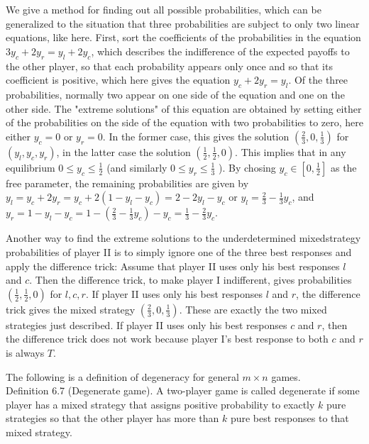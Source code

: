 \documentclass[12pt]{article}
\begin{document}
We give a method for finding out all possible probabilities, which can be generalized to the situation that three probabilities are subject to only two linear equations, like here. First, sort the coefficients of the probabilities in the equation $3 y_{c}+2 y_{r}=y_{l}+2 y_{c}$, which describes the indifference of the expected payoffs to the other player, so that each probability appears only once and so that its coefficient is positive, which here gives the equation $y_{c}+2 y_{r}=y_{l}$. Of the three\\
probabilities, normally two appear on one side of the equation and one on the other side. The "extreme solutions" of this equation are obtained by setting either of the probabilities on the side of the equation with two probabilities to zero, here either $y_{c}=0$ or $y_{r}=0$. In the former case, this gives the solution $\left(\frac{2}{3}, 0, \frac{1}{3}\right)$ for $\left(y_{l}, y_{c}, y_{r}\right)$, in the latter case the solution $\left(\frac{1}{2}, \frac{1}{2}, 0\right)$. This implies that in any equilibrium $0 \leq y_{c} \leq \frac{1}{2}$ (and similarly $0 \leq y_{r} \leq \frac{1}{3}$ ). By chosing $y_{c} \in\left[0, \frac{1}{2}\right]$ as the free parameter, the remaining probabilities are given by $y_{l}=y_{c}+2 y_{r}=y_{c}+2\left(1-y_{l}-y_{c}\right)=2-2 y_{l}-y_{c}$ or $y_{l}=\frac{2}{3}-\frac{1}{3} y_{c}$, and $y_{r}=1-y_{l}-y_{c}=1-\left(\frac{2}{3}-\frac{1}{3} y_{c}\right)-y_{c}=\frac{1}{3}-\frac{2}{3} y_{c}$.

Another way to find the extreme solutions to the underdetermined mixedstrategy probabilities of player II is to simply ignore one of the three best responses and apply the difference trick: Assume that player II uses only his best responses $l$ and $c$. Then the difference trick, to make player I indifferent, gives probabilities $\left(\frac{1}{2}, \frac{1}{2}, 0\right)$ for $l, c, r$. If player II uses only his best responses $l$ and $r$, the difference trick gives the mixed strategy $\left(\frac{2}{3}, 0, \frac{1}{3}\right)$. These are exactly the two mixed strategies just described. If player II uses only his best responses $c$ and $r$, then the difference trick does not work because player I's best response to both $c$ and $r$ is always $T$.

The following is a definition of degeneracy for general $m \times n$ games.\\
Definition 6.7 (Degenerate game). A two-player game is called degenerate if some player has a mixed strategy that assigns positive probability to exactly $k$ pure strategies so that the other player has more than $k$ pure best responses to that mixed strategy.
\end{document}

